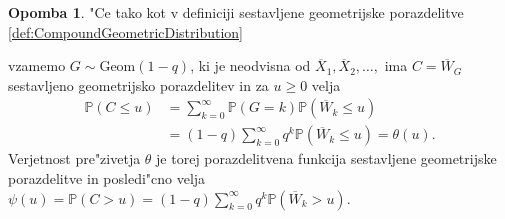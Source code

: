 \documentclass[12pt, a4paper, reqno]{amsart}
\theoremstyle{definition}
\newtheorem{opomba}[definicija]{Opomba}
\theoremstyle{plain}
\newcommand{\Prob}{\mathbb{P}}
\newcommand{\1}{\mathds{1}}
\newcommand*{\refPriloga}[1]{%
  \begingroup
    \hypersetup{
      linkcolor=red,
      linkbordercolor=red,
    }%
    \ref{#1}%
  \endgroup
}
\begin{document}
        \begin{opomba}
            "Ce tako kot v definiciji sestavljene geometrijske porazdelitve \refPriloga{def:CompoundGeometricDistribution} 
            vzamemo $G\sim\text{Geom}(1 - q)$, ki je neodvisna od $\overline{X}_1, \overline{X}_2, \dots,$ ima
            $C = \overline{W}_G$  sestavljeno geometrijsko porazdelitev in za $u\geq0$ velja
            \begin{align*}
             \Prob\left(C \leq u\right)
                    &= \sum_{k = 0}^\infty\Prob\left(G = k\right)\Prob\left(\overline{W}_k \leq u\right) \nonumber\\
                    &= (1 - q)\sum_{k = 0}^\infty q^k\Prob\left(\overline{W}_k \leq u\right) = \theta(u).
            \end{align*}
            Verjetnost pre"zivetja $\theta$ je torej porazdelitvena funkcija sestavljene geometrijske porazdelitve in posledi"cno 
            velja $\psi(u) = \Prob\left(C > u\right) = (1-q)\sum_{k=0}^\infty q^k\Prob\left(\overline{W}_k > u\right)$.
            \label{op:tezkorepnePorazdelitveAsimptotika}
        \end{opomba}
\end{document}
